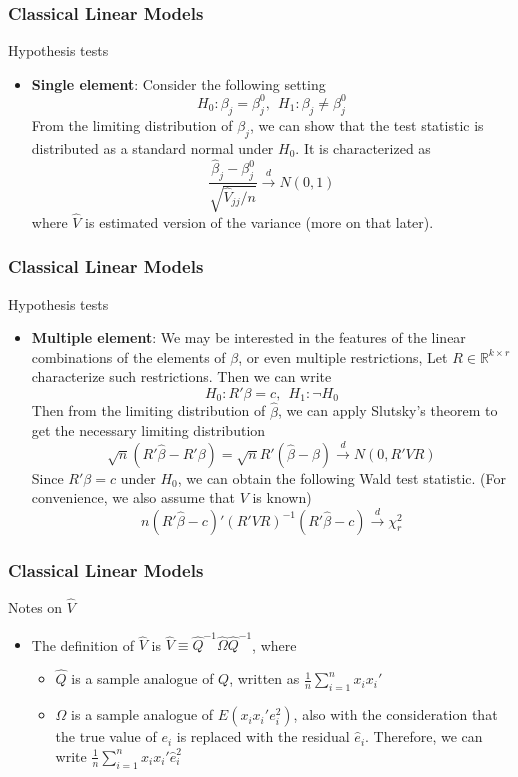 \documentclass{beamer}
\begin{document}
\begin{frame}
\frametitle{Classical Linear Models}
Hypothesis tests
\begin{itemize}
\item \textbf{Single element}: Consider the following setting
\[
H_0: \beta_j = \beta_j^0, \ \ H_1:\beta_j \neq \beta_j^0
\]
From the limiting distribution of $\beta_j$, we can show that the test statistic is distributed as a standard normal under $H_0$.  It is characterized as
\[
\frac{\hat{\beta}_j-\beta_j^0}{\sqrt{\widehat{V}_{jj}/n}}\xrightarrow{d}N(0,1)
\]
where $\widehat{V}$ is estimated version of the variance (more on that later). 
\end{itemize}
\end{frame}

\begin{frame}
\frametitle{Classical Linear Models}
Hypothesis tests
\begin{itemize}
\item \textbf{Multiple element}: We may be interested in the features of the linear combinations of the elements of $\beta$, or even multiple restrictions, Let $R\in\mathbb{R}^{k\times r}$ characterize such restrictions. Then we can write
\[
H_0 : R'\beta = c, \ \ H_1: \lnot H_0
\]
Then from the limiting distribution of $\hat{\beta}$, we can apply Slutsky's theorem to get the necessary limiting distribution
\[
\sqrt{n}(R'\hat{\beta}-R'\beta)=\sqrt{n}R'(\hat{\beta}-\beta)\xrightarrow{d}N(0,R'VR)
\]
Since $ R'\beta = c$ under $H_0$,  we can obtain the following Wald test statistic. (For convenience, we also assume that $V$ is known)
\[
n(R'\hat{\beta}-c)'(R'VR)^{-1}(R'\hat{\beta}-c)\xrightarrow{d}\chi^2_r
\]
\end{itemize}
\end{frame}

\begin{frame}
\frametitle{Classical Linear Models}
Notes on $\widehat{V}$
\begin{itemize}
\item The definition of $\widehat{V}$ is $\widehat{V}\equiv\widehat{Q}^{-1}\widehat{\Omega}\widehat{Q}^{-1}$, where
\begin{itemize}
\item $\widehat{Q}$ is a sample analogue of $Q$, written as $\frac{1}{n}\sum_{i=1}^nx_ix_i'$
\item $\widehat{\Omega}$ is a sample analogue of $E(x_ix_i'e_i^2)$, also with the consideration that the true value of $e_i$ is replaced with the residual $\hat{e}_i$. Therefore, we can write $\frac{1}{n}\sum_{i=1}^nx_ix_i'\hat{e}_i^2$
\end{itemize}
\end{itemize}
\end{frame}
\end{document}

